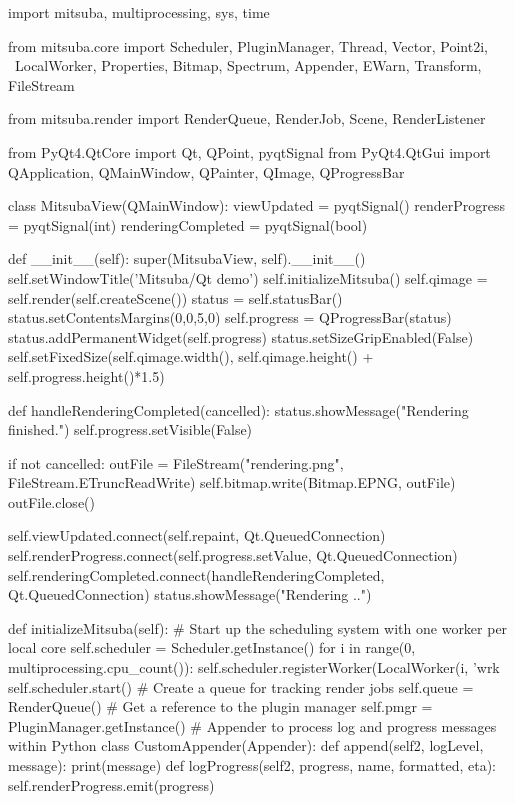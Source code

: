 \begin{python}
import mitsuba, multiprocessing, sys, time

from mitsuba.core import Scheduler, PluginManager, Thread, Vector, Point2i, \
    LocalWorker, Properties, Bitmap, Spectrum, Appender, EWarn, Transform, FileStream

from mitsuba.render import RenderQueue, RenderJob, Scene, RenderListener

from PyQt4.QtCore import Qt, QPoint, pyqtSignal
from PyQt4.QtGui import QApplication, QMainWindow, QPainter, QImage, QProgressBar

class MitsubaView(QMainWindow):
    viewUpdated = pyqtSignal()
    renderProgress = pyqtSignal(int)
    renderingCompleted = pyqtSignal(bool)

    def __init__(self):
        super(MitsubaView, self).__init__()
        self.setWindowTitle('Mitsuba/Qt demo')
        self.initializeMitsuba()
        self.qimage = self.render(self.createScene())
        status = self.statusBar()
        status.setContentsMargins(0,0,5,0)
        self.progress = QProgressBar(status)
        status.addPermanentWidget(self.progress)
        status.setSizeGripEnabled(False)
        self.setFixedSize(self.qimage.width(), self.qimage.height() +
            self.progress.height()*1.5)

        def handleRenderingCompleted(cancelled):
            status.showMessage("Rendering finished.")
            self.progress.setVisible(False)

            if not cancelled:
                outFile = FileStream("rendering.png", FileStream.ETruncReadWrite)
                self.bitmap.write(Bitmap.EPNG, outFile)
                outFile.close()

        self.viewUpdated.connect(self.repaint, Qt.QueuedConnection)
        self.renderProgress.connect(self.progress.setValue, Qt.QueuedConnection)
        self.renderingCompleted.connect(handleRenderingCompleted,
            Qt.QueuedConnection)
        status.showMessage("Rendering ..")

    def initializeMitsuba(self):
        # Start up the scheduling system with one worker per local core
        self.scheduler = Scheduler.getInstance()
        for i in range(0, multiprocessing.cpu_count()):
            self.scheduler.registerWorker(LocalWorker(i, 'wrk%
        self.scheduler.start()
        # Create a queue for tracking render jobs
        self.queue = RenderQueue()
        # Get a reference to the plugin manager
        self.pmgr = PluginManager.getInstance()
        # Appender to process log and progress messages within Python
        class CustomAppender(Appender):
            def append(self2, logLevel, message):
                print(message)
            def logProgress(self2, progress, name, formatted, eta):
                self.renderProgress.emit(progress)


\end{python}
